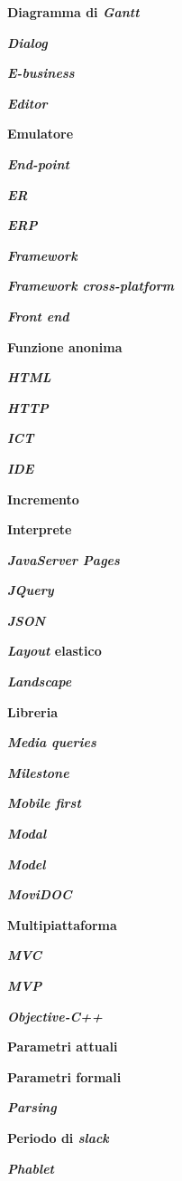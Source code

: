 \textbf{Diagramma di \textit{Gantt}}

\textbf{\textit{Dialog}}

\textbf{\textit{E-business}}

\textbf{\textit{Editor}}

\textbf{Emulatore}

\textbf{\textit{End-point}}

\textbf{\textit{ER}}

\textbf{\textit{ERP}}

\textbf{\textit{Framework}}

\textbf{\textit{Framework cross-platform}}

\textbf{\textit{Front end}}

\textbf{Funzione anonima}

\textbf{\textit{HTML}}

\textbf{\textit{HTTP}}

\textbf{\textit{ICT}}

\textbf{\textit{IDE}}

\textbf{Incremento}

\textbf{Interprete}

\textbf{\textit{JavaServer Pages}}

\textbf{\textit{JQuery}}

\textbf{\textit{JSON}}

\textbf{\textit{Layout} elastico}

\textbf{\textit{Landscape}}

\textbf{Libreria}

\textbf{\textit{Media queries}}

\textbf{\textit{Milestone}}

\textbf{\textit{Mobile first}}

\textbf{\textit{Modal}}

\textbf{\textit{Model}}

\textbf{\textit{MoviDOC}}

\textbf{Multipiattaforma}

\textbf{\textit{MVC}}

\textbf{\textit{MVP}}

\textbf{\textit{Objective-C++}}

\textbf{Parametri attuali}

\textbf{Parametri formali}

\textbf{\textit{Parsing}}

\textbf{Periodo di \textit{slack}}

\textbf{\textit{Phablet}}

